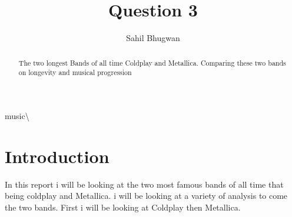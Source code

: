 \documentclass[12pt,preprint, authoryear]{elsarticle}
\numberwithin{equation}{section}
\numberwithin{figure}{section}
\numberwithin{table}{section}
\begin{document}
\begin{frontmatter}  %

\title{Question 3}





\author[Add1]{Sahil Bhugwan}





\address[Add1]{Github- \url{https://github.com/SBhugwan}}


\begin{abstract}
\small{
The two longest Bands of all time Coldplay and Metallica. Comparing
these two bands on longevity and musical progression
}
\end{abstract}

\vspace{1cm}


\begin{keyword}
\footnotesize{
music\textbackslash{} \\
\vspace{0.3cm}
}
\end{keyword}



\vspace{0.5cm}

\end{frontmatter}



\pagestyle{fancy}
\chead{}
\rhead{}
\lfoot{}
\lhead{}
\cfoot{}


\headsep 35pt %




\hypertarget{introduction}{%
\section{\texorpdfstring{Introduction
\label{Introduction}}{Introduction }}\label{introduction}}

In this report i will be looking at the two most famous bands of all
time that being coldplay and Metallica. i will be looking at a variety
of analysis to come the two bands. First i will be looking at Coldplay
then Metallica.
\end{document}
